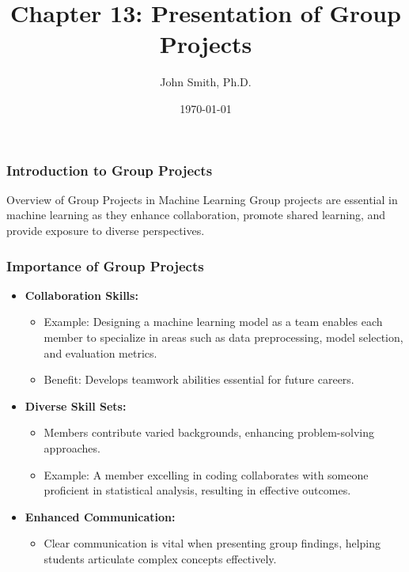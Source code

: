 \documentclass[aspectratio=169]{beamer}
\title[Chapter 13: Presentation of Group Projects]{Chapter 13: Presentation of Group Projects}
\author[J. Smith]{John Smith, Ph.D.}
\institute[University Name]{
  Department of Computer Science\\
  University Name\\
  \vspace{0.3cm}
  Email: email@university.edu\\
  Website: www.university.edu
}
\date{\today}
\begin{document}
\frame{\titlepage}

\begin{frame}[fragile]
    \frametitle{Introduction to Group Projects}
    \begin{block}{Overview of Group Projects in Machine Learning}
        Group projects are essential in machine learning as they enhance collaboration, promote shared learning, and provide exposure to diverse perspectives.
    \end{block}
\end{frame}

\begin{frame}[fragile]
    \frametitle{Importance of Group Projects}
    \begin{itemize}
        \item \textbf{Collaboration Skills:}
        \begin{itemize}
            \item Example: Designing a machine learning model as a team enables each member to specialize in areas such as data preprocessing, model selection, and evaluation metrics.
            \item Benefit: Develops teamwork abilities essential for future careers.
        \end{itemize}

        \item \textbf{Diverse Skill Sets:}
        \begin{itemize}
            \item Members contribute varied backgrounds, enhancing problem-solving approaches.
            \item Example: A member excelling in coding collaborates with someone proficient in statistical analysis, resulting in effective outcomes.
        \end{itemize}

        \item \textbf{Enhanced Communication:}
        \begin{itemize}
            \item Clear communication is vital when presenting group findings, helping students articulate complex concepts effectively.
        \end{itemize}
    \end{itemize}
\end{frame}
\end{document}

